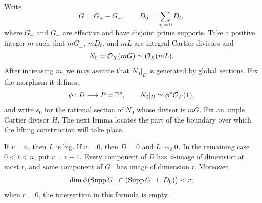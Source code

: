 Write
\[
 G=G_+-G_-,\qquad D_0=\sum_{a_i=0}D_i,
\]
where $G_+$ and $G_-$ are effective and have disjoint prime supports.
Take a positive integer $m$ such that $mG_\pm$, $mD_0$, and $mL$
are integral Cartier divisors and
\[
 N_0=\mathcal{O}_X(mG)\simeq\mathcal{O}_X(mL).
\]
After increasing $m$, we may assume that $N_0|_D$ is generated by
global sections.  Fix the morphism it defines,
\[
 \phi:D\longrightarrow P=\mathbb{P}^s,\qquad
 N_0|_D\simeq\phi^*\mathcal{O}_P(1),
\]
and write $s_0$ for the rational section of $N_0$ whose divisor is
$mG$. Fix an ample Cartier divisor $H$.
The next lemma locates the part of the boundary over
which the lifting construction will take place.

\begin{lemma}\label{sg:numerical-boundary}
If $v=n$, then $L$ is big.  If $v=0$, then $D=0$ and
$L\sim_{\mathbb{Q}}0$.  In the remaining case $0<v<n$, put $r=v-1$.
Every component of $D$ has $\phi$-image of dimension at most $r$,
and some component of $G_+$ has image of dimension $r$.
Moreover,
\[
 \dim\phi\bigl(\operatorname{Supp} G_+\cap(\operatorname{Supp} G_-\cup D_0)\bigr)<r;
\]
when $r=0$, the intersection in this formula is empty.
\end{lemma}

